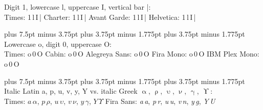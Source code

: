 \documentclass[11pt, a4paper, oneside]{article}
\newlength{\baselinedist}
\newlength{\smalllinespacing}
\newlength{\fsnormal}
\newlength{\fssmall}
\let \normalsizeOrig \normalsize
\let \smallOrig \small
\def\normalsize{%
		\normalsizeOrig%
		\fontsize{\fsnormal}{\baselinedist}\selectfont%
		\abovedisplayskip 13.5pt plus 6.75pt minus 3.375pt%
		\belowdisplayskip \abovedisplayskip%
		\abovedisplayshortskip 6.75pt plus 3.375pt minus 1.6875pt%
		\belowdisplayshortskip 6.75pt plus 3.375pt minus 1.6875pt%
	}
\def\normalsize{%
		\normalsizeOrig%
		\fontsize{\fsnormal}{\baselinedist}\selectfont%
		\abovedisplayskip 15pt plus 7.5pt minus 3.75pt%
		\belowdisplayskip \abovedisplayskip%
		\abovedisplayshortskip 7.5pt plus 3.75pt minus 1.775pt%
		\belowdisplayshortskip 7.5pt plus 3.75pt minus 1.775pt%
	}
\renewcommand{\small}{\smallOrig\fontsize{\fssmall}{\smalllinespacing}\selectfont}
\theoremstyle{Plain}
\theoremstyle{Definition}
\theoremstyle{Remark}
\begin{document}
\begin{longtblr}{}
	Digit 1, lowercase l, uppercase I, vertical bar |: \\
	\small%
	{\selectfont Times: 1\,l\,I\,|} \quad
	{\selectfont Charter: 1\,l\,I\,|} \quad
	{\selectfont Avant Garde: 1\,l\,I\,|} \quad
	{\selectfont Helvetica: 1\,l\,I\,|} 
	\par
	\normalsize%
	Lowercase o, digit 0, uppercase O: \\
	\small%
	{\selectfont Times: o\,0\,O}\quad
	{\selectfont Cabin: o\,0\,O}\quad
	{\selectfont Alegreya Sans: o\,0\,O}\quad
	{\selectfont Fira Mono: o\,0\,O}\quad
	{\selectfont IBM Plex Mono: o\,0\,O}
	\par
	\normalsize%
	Italic Latin a, p, u, v, y, Y vs. italic Greek $\upalpha$, $\uprho$, $\upupsilon$, $\upnu$, $\upgamma$, $\upUpsilon$: \\
	\small%
	Times: $a \, \alpha$, $p \, \rho$, $u \, \upsilon$, $v \, \nu$, $y \, \gamma$, $Y \, \mathit{\Upsilon}$
	\quad
	{\selectfont Fira Sans: {\itshape a\,{\selectfont a}}, {\itshape p\,{\selectfont r}}, {\itshape u\,{\selectfont u}}, {\itshape v\,{\selectfont n}}, {\itshape y\,{\selectfont g}}, {\itshape Y\,{\selectfont U}}}
\end{longtblr}
\end{document}
